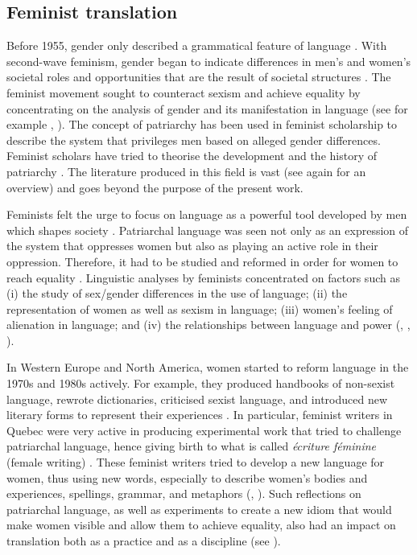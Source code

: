 \subsection{Feminist translation} \label{feministtranslation}

Before 1955, gender only described a grammatical feature of language \citep[89]{haig2004inexorable}. With second-wave feminism, gender began to indicate differences in men's and women's societal roles and opportunities that are the result of societal structures \citep[5]{von2016translation}. %
The feminist movement sought to counteract sexism and achieve equality by concentrating on the analysis of gender and its manifestation in language (see for example \cite{von1991feminist,von2016translation}, \cite{pauwels2003linguistic}). The concept of patriarchy has been used in feminist scholarship to describe the system that privileges men based on alleged gender differences. Feminist scholars have tried to theorise the development and the history of patriarchy \citep{miller2017patriarchy}. The literature produced in this field is vast (see again \cite{miller2017patriarchy} for an overview) and goes beyond the purpose of the present work.

Feminists felt the urge to focus on language as a powerful tool developed by men which shapes society \citep[8]{von2016translation}. Patriarchal language was seen not only as an expression of the system that oppresses women but also as playing an active role in their oppression. Therefore, it had to be studied and reformed in order for women to reach equality \citep[3]{cameron1985feminism}. Linguistic analyses by feminists concentrated on factors such as (i) the study of sex/gender differences in the use of language; (ii) the representation of women as well as sexism in language; (iii) women's feeling of alienation in language; and (iv) the relationships between language and power (\cite[7]{cameron1985feminism}, \cite[8]{von2016translation}, \cite[73--75]{kramer2016feminist}). 

In Western Europe and North America, women started to reform language in the 1970s and 1980s actively. For example, they produced handbooks of non-sexist language, rewrote dictionaries, criticised sexist language, and introduced new literary forms to represent their experiences \citep[9]{von2016translation}. In particular, feminist writers in Quebec were very active in producing experimental work that tried to challenge patriarchal language, hence giving birth to what is called \textit{écriture féminine} (female writing) \citep[72]{von1991feminist}. These feminist writers tried to develop a new language for women, thus using new words, especially to describe women's bodies and experiences, spellings, grammar, and metaphors (\cite[72]{von1991feminist}, \cite[15]{von2016translation}). Such reflections on patriarchal language, as well as experiments to create a new idiom that would make women visible and allow them to achieve equality, also had an impact on translation both as a practice and as a discipline (see \cite{von1991feminist,von2016translation}). 

